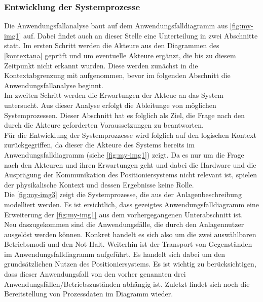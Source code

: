 \documentclass[../../../Bachelorarbeit.tex]{subfiles}
\begin{document}
\subsubsection{Entwicklung der Systemprozesse}
Die Anwendungsfallanalyse baut auf dem Anwendungsfalldiagramm aus \autoref{fig:my-img1} auf. Dabei findet auch an dieser Stelle eine Unterteilung in zwei Abschnitte statt. Im ersten Schritt werden die Akteure aus den Diagrammen des \autoref{kontextana} geprüft und um eventuelle Akteure ergänzt, die bis zu diesem Zeitpunkt nicht erkannt wurden. Diese werden zunächst in die Kontextabgrenzung mit aufgenommen, bevor im folgenden Abschnitt die Anwendungsfallanalyse beginnt.\\
Im zweiten Schritt werden die Erwartungen der Akteue an das System untersucht. Aus dieser Analyse erfolgt die Ableitunge von möglichen Systemprozessen. Dieser Abschnitt hat es folglich als Ziel, die Frage nach den durch die Akteure geforderten Voraussetzungen zu beantworten.\\
Für die Entwicklung der Systemprozzesse wird folglich auf den logischen Kontext zurückgegriffen, da dieser die Akteure des Systems bereits im Anwendungsfalldiagramm (siehe \autoref{fig:my-img1}) zeigt. Da es nur um die Frage nach den Akteuren und ihren Erwartungen geht und dabei die Hardware und die Ausprägung der Kommunikation des Positioniersystems nicht relevant ist, spielen der physikalische Kontext und dessen Ergebnisse keine Rolle.\\
Die \autoref{fig:my-img3} zeigt die Systemprozesse, die aus der Anlagenbeschreibung modelliert werden. Es ist ersichtlich, dass gezeigtes Anwendungsfalldiagramm eine Erweiterung der \autoref{fig:my-img1} aus dem vorhergegangenen Unterabschnitt ist.\\
Neu daszugekommen sind die Anwendungsfälle, die durch den Anlagennutzer ausgelöst werden können. Konkret handelt es sich also um die zwei auswählbaren Betriebsmodi und den Not-Halt. Weiterhin ist der Transport von Gegenständen im Anwendungsfalldiagramm aufgeführt. Es handelt sich dabei um den grundsätzlichen Nutzen des Positioniersystems. Es ist wichtig zu berücksichtigen, dass dieser Anwendungsfall von den vorher genannten drei Anwendungsfällen/Betriebszuständen abhängig ist. Zuletzt findet sich noch die Bereitstellung von Prozessdaten im Diagramm wieder.
\end{document}

